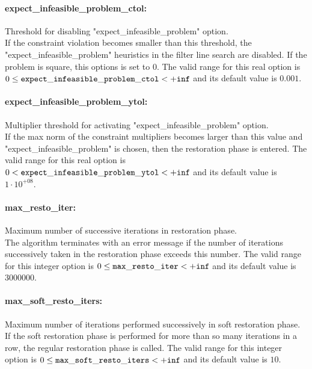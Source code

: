 \paragraph{expect\_infeasible\_problem\_ctol:}\label{sec:expect_infeasible_problem_ctol} Threshold for disabling "expect\_infeasible\_problem" option. $\;$ \\
 If the constraint violation becomes smaller than
this threshold, the "expect\_infeasible\_problem"
heuristics in the filter line search are
disabled. If the problem is square, this options
is set to 0. The valid range for this real option is 
$0 \le {\tt expect\_infeasible\_problem\_ctol } <  {\tt +inf}$
and its default value is $0.001$.


\paragraph{expect\_infeasible\_problem\_ytol:}\label{sec:expect_infeasible_problem_ytol} Multiplier threshold for activating "expect\_infeasible\_problem" option. $\;$ \\
 If the max norm of the constraint multipliers
becomes larger than this value and
"expect\_infeasible\_problem" is chosen, then the
restoration phase is entered. The valid range for this real option is 
$0 <  {\tt expect\_infeasible\_problem\_ytol } <  {\tt +inf}$
and its default value is $1 \cdot 10^{+08}$.


\paragraph{max\_resto\_iter:}\label{sec:max_resto_iter} Maximum number of successive iterations in restoration phase. $\;$ \\
 The algorithm terminates with an error message if
the number of iterations successively taken in
the restoration phase exceeds this number. The valid range for this integer option is
$0 \le {\tt max\_resto\_iter } <  {\tt +inf}$
and its default value is $3000000$.


\paragraph{max\_soft\_resto\_iters:}\label{sec:max_soft_resto_iters} Maximum number of iterations performed successively in soft restoration phase. $\;$ \\
 If the soft restoration phase is performed for
more than so many iterations in a row, the
regular restoration phase is called. The valid range for this integer option is
$0 \le {\tt max\_soft\_resto\_iters } <  {\tt +inf}$
and its default value is $10$.


